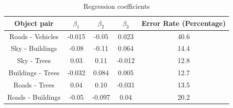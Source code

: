 \begin{table}[h]
	\centering
	\begin{tabular}{|c|c|c|c|c|}
		\hline
		\textbf{Object pair} & \textbf{$\beta_1$}  & \textbf{$\beta_2$} & \textbf{$\beta_3$}  & Error Rate (Percentage)\\
		\hline
		\hline
		Roads - Vehicles  & -0.015  & -0.05 & 0.023  & 40.6 \\
		\hline
		Sky - Buildings & -0.08 & -0.11 & 0.064 & 14.4 \\
		\hline
		Sky - Trees & 0.03 & 0.11 & -0.012 & 12.8  \\
		\hline
		Buildings - Trees & -0.032 & 0.084  & 0.005  & 12.7 \\
		\hline
		Roads - Trees & 0.04  & 0.10 &  -0.031  & 13.5  \\
		\hline
		Roads - Buildings & -0.05  & -0.097  &  0.04  & 20.2  \\
		\hline
	\end{tabular}
	\caption{Regression coefficients}
	\label{tab:regressioncoef}
\end{table}


